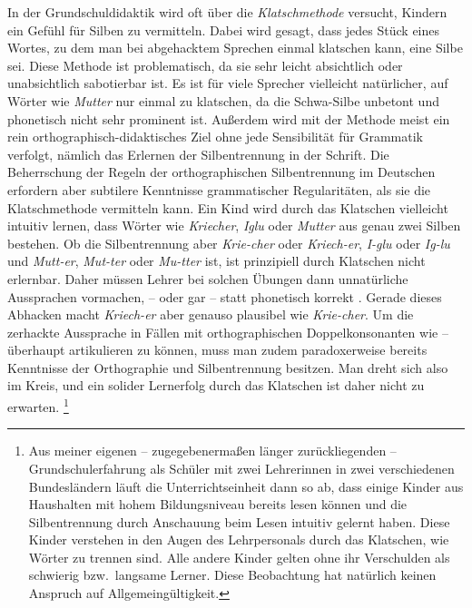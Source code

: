 In der Grundschuldidaktik wird oft über die \textit{Klatschmethode} versucht, Kindern ein Gefühl für Silben zu vermitteln.
Dabei wird gesagt, dass jedes Stück eines Wortes, zu dem man bei abgehacktem Sprechen einmal klatschen kann, eine Silbe sei.
Diese Methode ist problematisch, da sie sehr leicht absichtlich oder unabsichtlich sabotierbar ist.
Es ist für viele Sprecher vielleicht natürlicher, auf Wörter wie \textit{Mutter} \textipa{[mUt5]} nur einmal zu klatschen, da die Schwa-Silbe unbetont und phonetisch nicht sehr prominent ist.
Außerdem wird mit der Methode meist ein rein orthographisch-didaktisches Ziel ohne jede Sensibilität für Grammatik verfolgt, nämlich das Erlernen der Silbentrennung in der Schrift.
Die Beherrschung der Regeln der orthographischen Silbentrennung im Deutschen erfordern aber subtilere Kenntnisse grammatischer Regularitäten, als sie die Klatschmethode vermitteln kann.
Ein Kind wird durch das Klatschen vielleicht intuitiv lernen, dass Wörter wie \textit{Kriecher}, \textit{Iglu} oder \textit{Mutter} aus genau zwei Silben bestehen.
Ob die Silbentrennung aber \textit{Krie-cher} oder \textit{Kriech-er}, \textit{I-glu} oder \textit{Ig-lu} und \textit{Mutt-er}, \textit{Mut-ter} oder \textit{Mu-tter} ist, ist prinzipiell durch Klatschen nicht erlernbar.
Daher müssen Lehrer bei solchen Übungen dann unnatürliche Aussprachen vormachen, \zB \textipa{[mUt]} -- \textipa{[ta]} oder gar \textipa{[mUt]} -- \textipa{[tEK]} statt phonetisch korrekt \textipa{[mU.t5]}.
Gerade dieses Abhacken macht \textit{Kriech-er} aber genauso plausibel wie \textit{Krie-cher}.
Um die zerhackte Aussprache in Fällen mit orthographischen Doppelkonsonanten wie \textipa{[mUt]} -- \textipa{[ta]} überhaupt artikulieren zu können, muss man zudem paradoxerweise bereits Kenntnisse der Orthographie und Silbentrennung besitzen.
Man dreht sich also im Kreis, und ein solider Lernerfolg durch das Klatschen ist daher nicht zu erwarten.%
\footnote{Aus meiner eigenen -- zugegebenermaßen länger zurückliegenden -- Grundschulerfahrung als Schüler mit zwei Lehrerinnen in zwei verschiedenen Bundesländern läuft die Unterrichtseinheit dann so ab, dass einige Kinder aus Haushalten mit hohem Bildungsniveau bereits lesen können und die Silbentrennung durch Anschauung beim Lesen intuitiv gelernt haben.
Diese Kinder verstehen in den Augen des Lehrpersonals durch das Klatschen, wie Wörter zu trennen sind.
Alle andere Kinder gelten ohne ihr Verschulden als schwierig bzw.\ langsame Lerner.
Diese Beobachtung hat natürlich keinen Anspruch auf Allgemeingültigkeit.}

